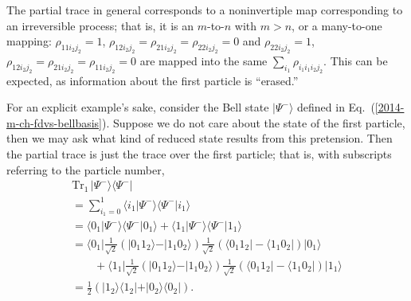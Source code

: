 The partial trace in general corresponds to a noninvertiple map corresponding to an irreversible process; that is,
it is an $m$-to-$n$ with $m>n$, or a many-to-one mapping:
$\rho_{1 1 i_2 j_2} = 1$, $\rho_{1 2 i_2 j_2} =   \rho_{2 1 i_2 j_2} =  \rho_{2 2 i_2 j_2} = 0$
and
$\rho_{2 2 i_2 j_2} = 1$, $\rho_{1 2 i_2 j_2} =   \rho_{2 1 i_2 j_2} =  \rho_{1 1 i_2 j_2} = 0$
are mapped into the same  $ \sum_{i_1} \rho_{i_1 i_1 i_2 j_2}$.
This can be expected, as information about the first particle is ``erased.''



{\color{blue}
\bexample




\label{bellstate}
For an explicit example's sake, consider the Bell state         $\vert \Psi^- \rangle$
defined in Eq.~(\ref{2014-m-ch-fdvs-bellbasis}).
Suppose we do not care about the state of the first particle, then we may ask what kind of reduced state results from this
pretension.
Then the partial trace is just the trace over the first particle; that is, with subscripts referring to the particle number,
\begin{equation}
\begin{split}
\textrm{Tr}_1\, \vert \Psi^- \rangle \langle  \Psi^-   \vert  \\
=\sum_{i_1=0}^1 \langle i_1 \vert \Psi^- \rangle \langle  \Psi^-  \vert i_1 \rangle \\
=\langle 0_1 \vert \Psi^- \rangle \langle  \Psi^-  \vert 0_1 \rangle
+
\langle 1_1  \vert \Psi^- \rangle \langle  \Psi^-  \vert 1_1 \rangle  \\
=\langle 0_1 \vert  \frac{1}{\sqrt{2}}\left(\vert 0_1   1_2 \rangle - \vert 1_1   0_2 \rangle  \right)  \frac{1}{\sqrt{2}}\left(\langle 0_1   1_2 \vert  - \langle 1_1   0_2 \vert   \right)  \vert 0_1 \rangle\\
\qquad
+
\langle 1_1 \vert  \frac{1}{\sqrt{2}}\left(\vert 0_1   1_2 \rangle - \vert 1_1   0_2 \rangle  \right)  \frac{1}{\sqrt{2}}\left(\langle 0_1   1_2 \vert  - \langle 1_1   0_2 \vert   \right)  \vert 1_1 \rangle  \\
= \frac{1}{2}
\left(
\vert 1_2 \rangle \langle   1_2 \vert
+
\vert 0_2 \rangle \langle   0_2 \vert
\right)
.
\end{split}
\end{equation}

}
